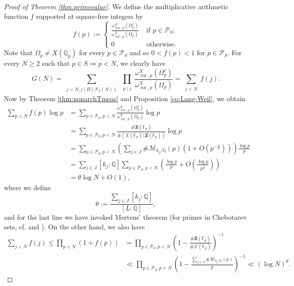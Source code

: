 \documentclass[11pt,letterpaper]{amsart}
\newcommand{\BF}{{\mathbb {F}}}
\newcommand{\BQ}{{\mathbb {Q}}}
\newcommand{\CM}{{\mathcal {M}}}
\newcommand{\CP}{{\mathcal {P}}}
\newcommand{\CX}{{\mathcal {X}}}
\theoremstyle{plain}
\numberwithin{equation}{section}
\theoremstyle{definition}
\theoremstyle{remark}
\begin{document}
\begin{proof}[Proof of Theorem \ref{thm:primevalue}]
We define the multiplicative arithmetic function $f$ supported at square-free integers by $$f(p):=\begin{cases}
	\frac{\omega_{\operatorname{tor},p}^X(\Omega_p^c)}{\omega_{\operatorname{tor},p}^X(\Omega_p)}&\text{ if } p\in \CP_{S};\\ 0 &\text{ otherwise}.
\end{cases}$$
Note that $\Omega_p\neq X(\BQ_p)$ for every $p\in \CP_{S}$ and so $0<f(p)<1$ for $p\in\CP_{S}$. For every $N\geqslant 2$ such that $p\in S\Rightarrow p<N$, we clearly have
$$G(N)=\sum_{\substack{j<N,j\mid\Pi(\CP_{S}(N))}}\prod_{\substack{p\mid j}}\frac{\omega_{\operatorname{tor},p}^X(\Omega_p^c)}{\omega_{\operatorname{tor},p}^X(\Omega_p)}= \sum_{\substack{j<N}}f(j).$$
Now by Theorem \ref{thm:nonarchTmeas} and Proposition \ref{co:Lang-Weil}, we obtain
\begin{equation}\label{eq:wirsing1}
	\begin{split}
		\sum_{p<N}f(p)\log p&=\sum_{p\in\CP_S, p<N}\frac{\omega_{\operatorname{tor},p}^X(\Omega_p^c)}{\omega_{\operatorname{tor},p}^X(\Omega_p)}\log p\\ &=\sum_{p\in\CP_S,p<N}\frac{\#\mathbf{Z}(\BF_p)}{\#(\CX(\BF_p)\setminus \mathbf{Z}(\BF_p))}\log p\\ &=\sum_{p\in\CP_S,p<N}\left(\sum_{j\in J}\#\CM_{k_j/\BQ}(p)(1+O(p^{-\frac{1}{2}}))\right)\frac{\log p}{p}\\ &=\sum_{j\in J}[k_j:\BQ]\sum_{p\in\CP_S,p<N}\left(\frac{\log p}{p}+O\left(\frac{\log p}{p^{\frac{3}{2}}}\right)\right)\\ &=\theta\log N+O(1),
	\end{split}
\end{equation}
where we define \begin{equation}\label{eq:theta}
	\theta:=\frac{\sum_{j\in J}[k_j:\BQ]}{[L:\BQ]},
\end{equation} and for the last line we have invoked Mertens' theorem (for primes in Chebotarev sets, cf. \cite[Theorem A]{A-K-K} and \cite[Theorem 8.3]{B-F}).
On the other hand, we also have
\begin{equation}\label{eq:wirsing2}
	\begin{split}
		\sum_{j<N}f(j)\leqslant\prod_{p<N}\left(1+f(p)\right)&=\prod_{p\in\CP_S,p<N}\left(1-\frac{\#\mathbf{Z}(\BF_p)}{\#\CX(\BF_p)}\right)^{-1}\\&\ll \prod_{p\in\CP_S,p<N}\left(1-\frac{\sum_{j\in J}\#\CM_{k_j/\BQ}(p)}{p}\right)^{-1}\ll (\log N)^{\theta}. \end{split}
\end{equation}

\end{proof}
\end{document}

